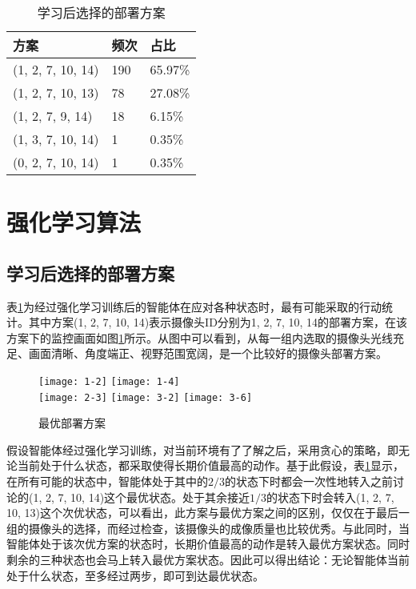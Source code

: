 \begin{table}[h!]
    \centering
    \caption{学习后选择的部署方案}
    \label{tab:rlresult}
    \begin{tabularx}{\textwidth}{XXX}
    \toprule
    方案               & 频次  & 占比      \\ \midrule
    (1, 2, 7, 10, 14) & 190 & 65.97\% \\
    (1, 2, 7, 10, 13) & 78  & 27.08\% \\
    (1, 2, 7, 9, 14)  & 18  & 6.15\%  \\
    (1, 3, 7, 10, 14) & 1   & 0.35\%  \\
    (0, 2, 7, 10, 14) & 1   & 0.35\%  \\ \bottomrule
    \end{tabularx}
\end{table}

\section{强化学习算法}

\subsection{学习后选择的部署方案}

表\ref{tab:rlresult}为经过强化学习训练后的智能体在应对各种状态时，最有可能采取的行动统计。其中方案(1, 2, 7, 10, 14)表示摄像头ID分别为1, 2, 7, 10, 14的部署方案，在该方案下的监控画面如图\ref{fig:rlresult}所示。从图中可以看到，从每一组内选取的摄像头光线充足、画面清晰、角度端正、视野范围宽阔，是一个比较好的摄像头部署方案。

\begin{figure}
\centering
\texttt{[image: 1-2]}
\texttt{[image: 1-4]}\\
\texttt{[image: 2-3]}
\texttt{[image: 3-2]}
\texttt{[image: 3-6]}
\caption{最优部署方案}
\label{fig:rlresult}
\end{figure}

假设智能体经过强化学习训练，对当前环境有了了解之后，采用贪心的策略，即无论当前处于什么状态，都采取使得长期价值最高的动作。基于此假设，表\ref{tab:rlresult}显示，在所有可能的状态中，智能体处于其中的$2/3$的状态下时都会一次性地转入之前讨论的(1, 2, 7, 10, 14)这个最优状态。处于其余接近$1/3$的状态下时会转入(1, 2, 7, 10, 13)这个次优状态，可以看出，此方案与最优方案之间的区别，仅仅在于最后一组的摄像头的选择，而经过检查，该摄像头的成像质量也比较优秀。与此同时，当智能体处于该次优方案的状态时，长期价值最高的动作是转入最优方案状态。同时剩余的三种状态也会马上转入最优方案状态。因此可以得出结论：无论智能体当前处于什么状态，至多经过两步，即可到达最优状态。

